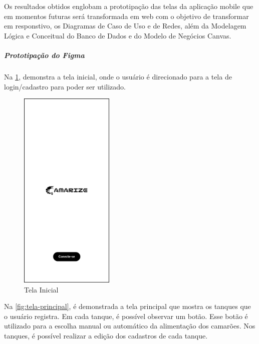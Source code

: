 Os resultados obtidos englobam a prototipação das telas da aplicação mobile que em momentos futuras será transformada em web com o objetivo de transformar em responstivo, os Diagramas de Caso de Uso e de Redes, além da Modelagem Lógica e Conceitual do Banco de Dados e do Modelo de Negócios Canvas.

\subparagraph*{\textbf{Prototipação do Figma}}

Na \cref{fig:tela-inicial}, demonstra a tela inicial, onde o usuário é direcionado para a tela de login/cadastro para poder ser utilizado.

\begin{figure}[!htb]
\centering
{}
\caption{Tela Inicial}%
\label{fig:tela-inicial}
\includegraphics[width = 0.4\textwidth]{Imagens/TELA INICIAL.png}
\end{figure}

\newpage

Na \cref{fig:tela-principal}, é demonstrada a tela principal que mostra os tanques que o usuário registra. Em cada tanque, é possível observar um botão. Esse botão é utilizado para a escolha manual ou automático da alimentação dos camarões. Nos tanques, é possível realizar a edição dos cadastros de cada tanque. 

